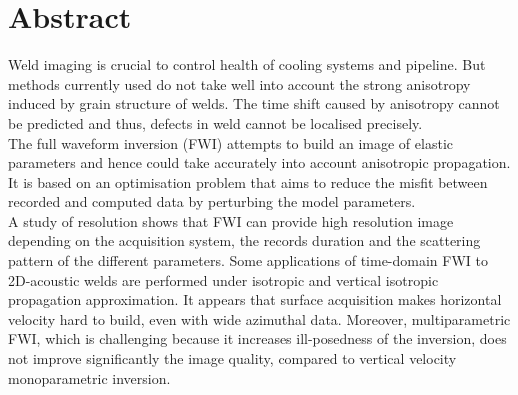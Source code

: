 \section*{Abstract}

Weld imaging is crucial to control health of cooling systems and pipeline. But methods currently used do not take well into account the strong anisotropy induced by grain structure of welds. The time shift caused by anisotropy cannot be predicted and thus, defects in weld cannot be localised precisely. \\

The full waveform inversion (FWI) attempts to build an image of elastic parameters and hence could take accurately into account anisotropic propagation. It is based on an optimisation problem that aims to reduce the misfit between recorded and computed data by perturbing the model parameters. \\

A study of resolution shows that FWI can provide high resolution image depending on the acquisition system, the records duration and the scattering pattern of the different parameters. Some applications of time-domain FWI to 2D-acoustic welds are performed under isotropic and vertical isotropic propagation approximation. It appears that surface acquisition makes horizontal velocity hard to build, even with wide azimuthal data. Moreover, multiparametric FWI, which is challenging because it increases ill-posedness of the inversion, does not improve significantly the image quality, compared to vertical velocity monoparametric inversion.



